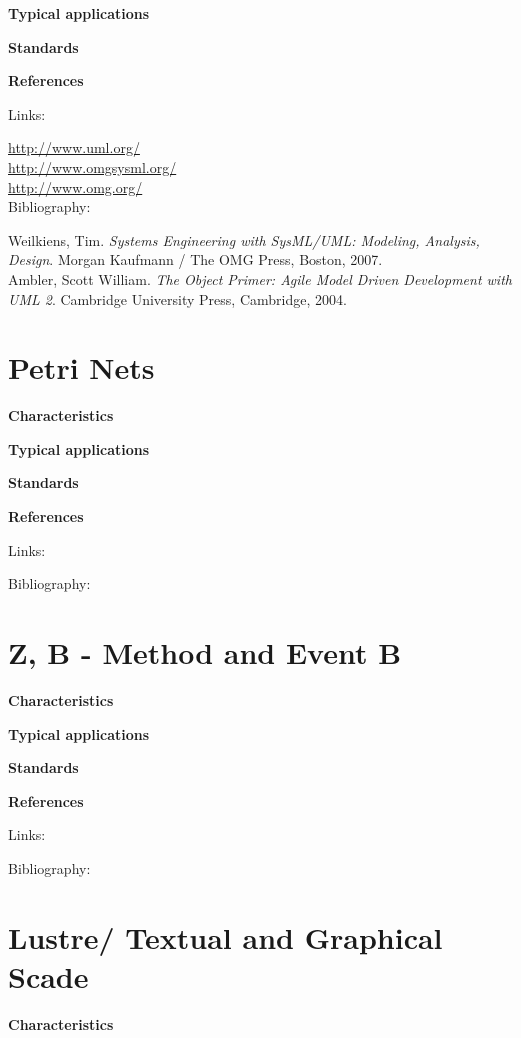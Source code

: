 \documentclass{./template/openetcs_report}
\begin{document}
	\textbf{Typical applications}


	\textbf{Standards}


	\textbf{References}

Links:

\url{http://www.uml.org/} \\[4pt]
\url{http://www.omgsysml.org/}\\[4pt]
\url{http://www.omg.org/} \\[4pt]

Bibliography:

Weilkiens, Tim. \textit{Systems Engineering with SysML/UML: Modeling, Analysis, Design}. Morgan Kaufmann / The OMG Press, Boston,  2007.\\[4pt]
Ambler, Scott William. \textit{The Object Primer: Agile Model Driven Development with UML 2}. Cambridge University Press, Cambridge, 2004.\\[4pt]

\section{Petri Nets}


	\textbf{Characteristics}


	\textbf{Typical applications}


	\textbf{Standards}


	\textbf{References}

Links:



Bibliography:




\section{Z, B - Method and Event B}


	\textbf{Characteristics}


	\textbf{Typical applications}


	\textbf{Standards}


	\textbf{References}

Links:



Bibliography:

\section{Lustre/ Textual and Graphical Scade}

	\textbf{Characteristics}
\end{document}
